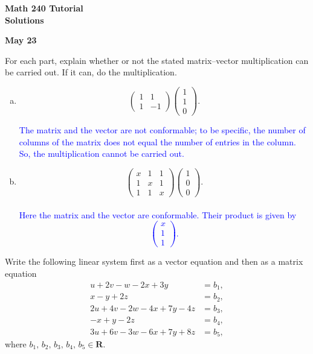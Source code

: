 \documentclass[a4paper,11pt]{article}
\newcommand{\R}{\mathbf{R}}
\newcommand{\BB}[1]{\textcolor{blue}{#1}}
\begin{document}
\begin{center}
  {\Large\bfseries Math 240 Tutorial \\ Solutions}
\end{center}
\begin{center}
  {\bfseries May 23}
\end{center}

 For each part, explain whether or not the stated
matrix--vector multiplication can be carried out. If it can, do the multiplication.
\begin{enumerate}[(a)]
\item
  \[
    \begin{pmatrix}
      1&1\\1&-1
    \end{pmatrix}
    \begin{pmatrix}
      1\\1\\0
    \end{pmatrix}.
  \]

  \BB{ The matrix and the vector are not conformable; to be specific, the number
of columns of the matrix does not equal the number of entries in the column. So,
the multiplication cannot be carried out. \\ }
  
\item
  \[
    \begin{pmatrix}
      x & 1 & 1 \\
      1 & x & 1 \\
      1 & 1 & x
    \end{pmatrix}
    \begin{pmatrix}
      1\\0\\0
    \end{pmatrix}.
  \] \\

  \BB{ Here the matrix and the vector are conformable. Their product is given by
    \[
      \begin{pmatrix}
        x\\1\\1
      \end{pmatrix}.
    \]
  }
  
\end{enumerate}

 Write the following linear system first as a
vector equation and then as a matrix equation
\begin{align*}
  u+2v-w-2x+3y &= b_1, \\
  x-y+2z &= b_2, \\
  2u+4v-2w-4x+7y-4z &= b_3, \\
  -x+y-2z &= b_4, \\
  3u+6v-3w-6x+7y+8z &= b_5,
\end{align*}
where $b_1,\,b_2,\,b_3,\,b_4,\,b_5 \in \R$. \\
\end{document}
